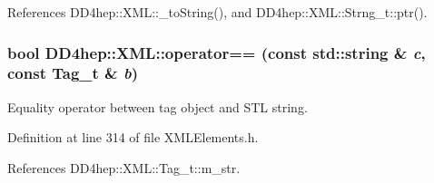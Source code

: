 References DD4hep::XML::\_\-toString(), and DD4hep::XML::Strng\_\-t::ptr().\hypertarget{group___d_d4_h_e_p___x_m_l_ga147592045f1692bc1bce671299c71a77}{
\subsubsection[{operator==}]{\setlength{\rightskip}{0pt plus 5cm}bool DD4hep::XML::operator== (const std::string \& {\em c}, \/  const Tag\_\-t \& {\em b})}}
\label{group___d_d4_h_e_p___x_m_l_ga147592045f1692bc1bce671299c71a77}


Equality operator between tag object and STL string. 

Definition at line 314 of file XMLElements.h.

References DD4hep::XML::Tag\_\-t::m\_\-str.